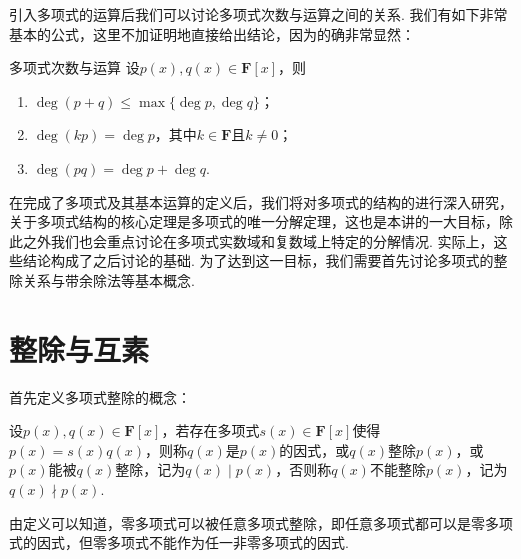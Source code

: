 引入多项式的运算后我们可以讨论多项式次数与运算之间的关系. 我们有如下非常基本的公式，这里不加证明地直接给出结论，因为的确非常显然：
\begin{theorem}{}{多项式次数与运算}
    设$p(x),q(x)\in\mathbf{F}[x]$，则
    \begin{enumerate}
        \item $\deg(p+q)\leqslant \max\{\deg p,\deg q\}$；
        \item $\deg(kp)=\deg p$，其中$k\in\mathbf{F}$且$k\neq 0$；
        \item $\deg(pq)=\deg p+\deg q$.
    \end{enumerate}
\end{theorem}

在完成了多项式及其基本运算的定义后，我们将对多项式的结构的进行深入研究，关于多项式结构的核心定理是多项式的唯一分解定理，这也是本讲的一大目标，除此之外我们也会重点讨论在多项式实数域和复数域上特定的分解情况. 实际上，这些结论构成了之后讨论的基础. 为了达到这一目标，我们需要首先讨论多项式的整除关系与带余除法等基本概念.

\section{整除与互素}
首先定义多项式整除的概念：
\begin{definition}{}{}
    设$p(x),q(x)\in\mathbf{F}[x]$，若存在多项式$s(x)\in\mathbf{F}[x]$使得$p(x)=s(x)q(x)$，则称$q(x)$是$p(x)$的因式，或$q(x)$整除$p(x)$，或$p(x)$能被$q(x)$整除，记为$q(x)\mid p(x)$，否则称$q(x)$不能整除$p(x)$，记为$q(x)\nmid p(x)$.
\end{definition}

由定义可以知道，零多项式可以被任意多项式整除，即任意多项式都可以是零多项式的因式，但零多项式不能作为任一非零多项式的因式.

